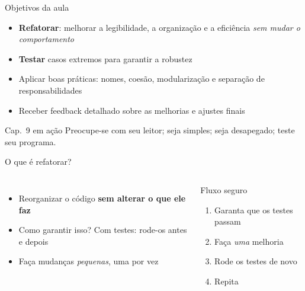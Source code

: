 \documentclass[aspectratio=169,10pt,t]{beamer}
\begin{document}
\capa

\begin{frame}{Objetivos da aula}
  \begin{itemize}
    \item \textbf{Refatorar}: melhorar a legibilidade, a organização e a eficiência \emph{sem mudar o comportamento}
    \item \textbf{Testar} casos extremos para garantir a robustez
    \item Aplicar boas práticas: nomes, coesão, modularização e separação de responsabilidades
    \item Receber feedback detalhado sobre as melhorias e ajustes finais
  \end{itemize}
  \begin{exampleblock}{Cap.~9 em ação}
    Preocupe-se com seu leitor; seja simples; seja desapegado; teste seu programa.
  \end{exampleblock}
\end{frame}

\begin{frame}{O que é refatorar?}
  \begin{columns}[T]
    \begin{itemize}
      \item Reorganizar o código \textbf{sem alterar o que ele faz}
      \item Como garantir isso? \alert{Com testes}: rode-os antes e depois
      \item Faça mudanças \emph{pequenas}, uma por vez
    \end{itemize}
    \begin{block}{Fluxo seguro}
      \begin{enumerate}\small
        \item Garanta que os testes passam
        \item Faça \emph{uma} melhoria
        \item Rode os testes de novo
        \item Repita
      \end{enumerate}
    \end{block}
  \end{columns}
\end{frame}
\end{document}
